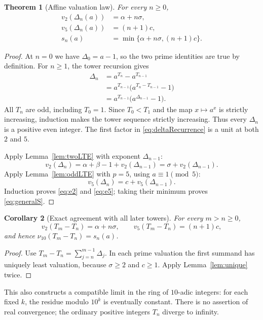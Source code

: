 \documentclass[11pt,a4paper]{article}
\newtheorem{theorem}{Theorem}[section]
\newtheorem{corollary}[theorem]{Corollary}
\theoremstyle{definition}
\theoremstyle{remark}
\begin{document}
\begin{theorem}[Affine valuation law]\label{thm:affine}
For every $n\ge0$,
\begin{align}
 v_2(\Delta_n(a))&=\alpha+n\sigma,\label{eq:e2}\\
 v_5(\Delta_n(a))&=(n+1)c,\label{eq:e5}\\
 s_n(a)&=\min\{\alpha+n\sigma,(n+1)c\}.\label{eq:generalS}
\end{align}
\end{theorem}
\begin{proof}
At $n=0$ we have $\Delta_0=a-1$, so the two prime identities are true by definition. For $n\ge1$, the tower recursion gives
\begin{equation}\label{eq:deltaRecurrence}
 \begin{split}
 \Delta_n
 &=a^{T_n}-a^{T_{n-1}}\\
 &=a^{T_{n-1}}\bigl(a^{T_n-T_{n-1}}-1\bigr)\\
 &=a^{T_{n-1}}\bigl(a^{\Delta_{n-1}}-1\bigr).
 \end{split}
\end{equation}
All $T_n$ are odd, including $T_0=1$. Since $T_0<T_1$ and the map $x\mapsto a^x$ is strictly increasing, induction makes the tower sequence strictly increasing. Thus every $\Delta_n$ is a positive even integer. The first factor in \eqref{eq:deltaRecurrence} is a unit at both $2$ and $5$.

Apply Lemma~\ref{lem:twoLTE} with exponent $\Delta_{n-1}$:
\[
 v_2(\Delta_n)=\alpha+\beta-1+v_2(\Delta_{n-1})
 =\sigma+v_2(\Delta_{n-1}).
\]
Apply Lemma~\ref{lem:oddLTE} with $p=5$, using $a\equiv1\pmod5$:
\[
 v_5(\Delta_n)=c+v_5(\Delta_{n-1}).
\]
Induction proves \eqref{eq:e2} and \eqref{eq:e5}; taking their minimum proves \eqref{eq:generalS}.
\end{proof}

\begin{corollary}[Exact agreement with all later towers]\label{cor:alllater}
For every $m>n\ge0$,
\[
 v_2(T_m-T_n)=\alpha+n\sigma,\qquad
 v_5(T_m-T_n)=(n+1)c,
\]
and hence $\nu_{10}(T_m-T_n)=s_n(a)$.
\end{corollary}
\begin{proof}
Use $T_m-T_n=\sum_{j=n}^{m-1}\Delta_j$. In each prime valuation the first summand has uniquely least valuation, because $\sigma\ge2$ and $c\ge1$. Apply Lemma~\ref{lem:unique} twice.
\end{proof}

This also constructs a compatible limit in the ring of $10$-adic integers: for each fixed $k$, the residue modulo $10^k$ is eventually constant. There is no assertion of real convergence; the ordinary positive integers $T_n$ diverge to infinity.
\end{document}
